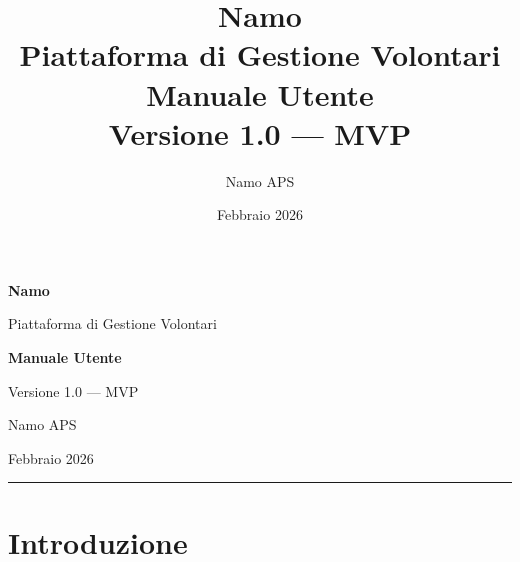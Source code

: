 \documentclass[a4paper,11pt,oneside]{book}
\title{%
  \vspace{-1cm}
  {\Huge\bfseries\textcolor{namoCharcoal}{Namo}}\\[0.3em]
  {\LARGE\textcolor{namoCyan}{Piattaforma di Gestione Volontari}}\\[1.5em]
  {\Large Manuale Utente}\\[0.5em]
  {\large Versione 1.0 --- MVP}
}
\author{Namo APS}
\date{Febbraio 2026}
\begin{document}
\begin{titlepage}
  \centering
  \vspace*{2cm}


  \vspace{2cm}

  {\Huge\bfseries\textcolor{namoCharcoal}{Namo}}\par
  \vspace{0.5cm}
  {\LARGE\textcolor{namoCyan}{Piattaforma di Gestione Volontari}}\par
  \vspace{1.5cm}
  {\Large\bfseries Manuale Utente}\par
  \vspace{0.3cm}
  {\large Versione 1.0 --- MVP}\par

  \vfill

  {\large\textcolor{namoCharcoal}{Namo APS}}\par
  \vspace{0.3cm}
  {\normalsize Febbraio 2026}\par

  \vspace{1cm}
  \textcolor{namoCyan}{\rule{0.4\textwidth}{1pt}}
\end{titlepage}

\tableofcontents
\clearpage

\chapter{Introduzione}
\label{ch:introduzione}

\end{document}
